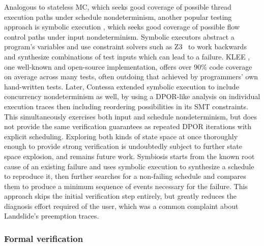 Analogous to stateless MC,
which seeks good coverage of possible thread execution paths under schedule nondeterminism,
another popular testing approach is symbolic execution \cite{symbolic},
which seeks good coverage of possible flow control paths under input nondeterminism.
Symbolic executors
abstract a program's variables and use constraint solvers such as Z3~\cite{z3}
to work backwards and synthesize combinations of test inputs which can lead to a failure.
%
KLEE \cite{klee}, one well-known and open-source implementation,
offers over 90\% code coverage on average across many tests,
often outdoing that achieved by programmers' own hand-written tests.
%
Later, Contessa \cite{contessa} extended symbolic execution to include concurrency nondeterminism as well,
by using a DPOR-like analysis on individual execution traces
then including reordering possibilities in its SMT constraints.
This simultaneously exercises both input and schedule nondeterminism,
but does not provide the same verification guarantees as repeated DPOR iterations with explicit scheduling.
Exploring both kinds of state space at once thoroughly enough to provide strong verification
is undoubtedly subject to further state space explosion,
and remains future work.
%
Symbiosis \cite{symbiosis} starts from the known root cause of an existing failure
and uses symbolic execution to synthesize a schedule to reproduce it,
then further searches for a non-failing schedule and compares them to produce
a minimum sequence of events necessary for the failure.
This approach skips the initial verification step entirely,
but greatly reduces the diagnosis effort required of the user,
which was a common complaint about Landslide's preemption traces.

\subsubsection{Formal verification}

